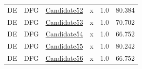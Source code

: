 \documentclass{article}
\begin{document}
\begin{longtable}{llllrr}
DE&DFG &\href{C:/Users/hootanz/eclipse-workspace/processICPM/20251209_215703/DFG/DE/candidate52.dfg}{Candidate52} & x &1.0&80.384\\
DE&DFG &\href{C:/Users/hootanz/eclipse-workspace/processICPM/20251209_215703/DFG/DE/candidate53.dfg}{Candidate53} & x &1.0&70.702\\
DE&DFG &\href{C:/Users/hootanz/eclipse-workspace/processICPM/20251209_215703/DFG/DE/candidate54.dfg}{Candidate54} & x &1.0&66.752\\
DE&DFG &\href{C:/Users/hootanz/eclipse-workspace/processICPM/20251209_215703/DFG/DE/candidate55.dfg}{Candidate55} & x &1.0&80.242\\
DE&DFG &\href{C:/Users/hootanz/eclipse-workspace/processICPM/20251209_215703/DFG/DE/candidate56.dfg}{Candidate56} & x &1.0&66.752\\
\bottomrule
\end{longtable}
\end{document}
